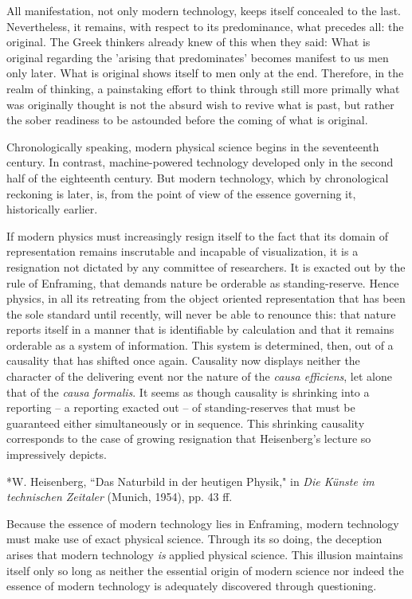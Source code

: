 \documentclass[12pt]{article}
\begin{document}
All manifestation, not only modern technology, keeps itself concealed to the last. Nevertheless, it remains, with respect to its predominance, what precedes all: the original. The Greek thinkers already knew of this when they said: What is original regarding the 'arising that predominates' becomes manifest to us men only later. What is original shows itself to men only at the end. Therefore, in the realm of thinking, a painstaking effort to think through still more primally what was originally thought is not the absurd wish to revive what is past, but rather the sober readiness to be astounded before the coming of what is original.

Chronologically speaking, modern physical science begins in the seventeenth century. In contrast, machine-powered technology developed only in the second half of the eighteenth century. But modern technology, which by chronological reckoning is later, is, from the point of view of the essence governing it, historically earlier.

If modern physics must increasingly resign itself to the fact that its domain of representation remains inscrutable and incapable of visualization, it is a resignation not dictated by any committee of researchers. It is exacted out by the rule of Enframing, that demands nature be orderable as standing-reserve. Hence physics, in all its retreating from the object oriented representation that has been the sole standard until recently, will never be able to renounce this: that nature reports itself in a manner that is identifiable by calculation and that it remains orderable as a system of information. This system is determined, then, out of a causality that has shifted once again. Causality now displays neither the character of the delivering event nor the nature of the \textit{causa efficiens}, let alone that of the \textit{causa formalis}. It seems as though causality is shrinking into a reporting -- a reporting exacted out -- of standing-reserves that must be guaranteed either simultaneously or in sequence.  This shrinking causality corresponds to the case of growing resignation that Heisenberg's lecture so impressively depicts.

*W. Heisenberg, ``Das Naturbild in der heutigen Physik," in \textit{Die K{\"u}nste im technischen Zeitaler} (Munich, 1954), pp. 43 ff.

Because the essence of modern technology lies in Enframing, modern technology must make use of exact physical science. Through its so doing, the deception arises that modern technology \textit{is} applied physical science. This illusion maintains itself only so long as neither the essential origin of modern science nor indeed the essence of modern technology is adequately discovered through questioning.
\end{document}
